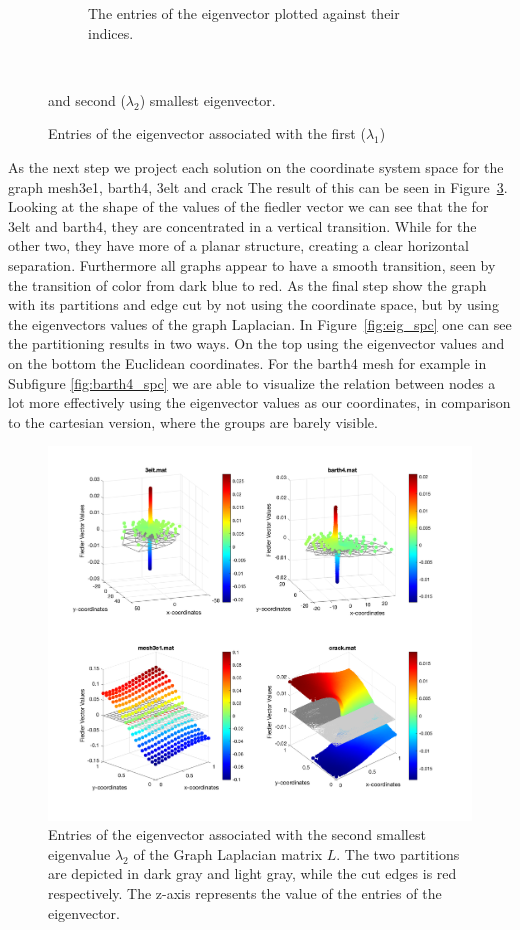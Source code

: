 \begin{figure}[H]
\begin{subfigure}{0.5\textwidth}
		\caption{The entries of the eigenvector plotted against their indices. }
		\label{sfig:eig2}
	\end{subfigure}\\
	\caption{Entries of the eigenvector associated with the first ($\lambda_1$)} and second ($\lambda_2$) smallest eigenvector.
	\label{fig:eig}
\end{figure}
As the next step we project each solution on the coordinate system space for the graph mesh3e1, barth4, 3elt and crack The result of this can be seen in Figure~\ref{fig:proj}. Looking at the shape of the values of the fiedler vector we can see that the for 3elt and barth4, they are concentrated in a vertical transition.
While for the other two, they have more of a planar structure, creating a clear horizontal separation. Furthermore all graphs appear to have a smooth transition, seen by the transition of color from dark blue to red.
\newline
\newline
As the final step show the graph with its partitions and edge cut by not using the coordinate space, but by using the eigenvectors values of the graph Laplacian.
In Figure~\ref{fig:eig_spc} one can see the partitioning results in two ways. On the top using the eigenvector values and on the bottom the Euclidean coordinates. For the barth4 mesh for example in Subfigure \ref{fig:barth4_spc} we are able to visualize the relation between nodes a lot more effectively using the eigenvector values as our coordinates, in comparison to the cartesian version, where the groups are barely visible. 
\begin{figure}[H]
	\centering
	\includegraphics[width=\textwidth]{./media/fiedler.png}
	\caption{Entries of the eigenvector associated with the second smallest eigenvalue $\lambda_2$ of the Graph Laplacian matrix $L$. The two partitions are depicted in dark gray and light gray, while the cut edges is red respectively. The z-axis represents the value of the entries of the eigenvector. }
	\label{fig:proj}
\end{figure}

